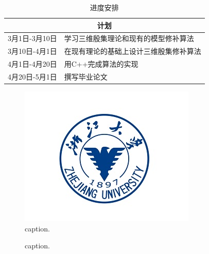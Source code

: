\documentclass[oneside,a4paper]{article}
\begin{document}
\begin{table}[!htbp]
    \centering
    \label{table1}
    \caption{进度安排}
    \begin{tabular}{|l|l|}
        \hline
        \multicolumn{2}{|c|}{计划} \\
        \hline
        3月1日-3月10日 & 学习三维殷集理论和现有的模型修补算法 \\
        \hline
        3月10日-4月1日 & 在现有理论的基础上设计三维殷集修补算法 \\
        \hline
        4月1日-4月20日 & 用C++完成算法的实现 \\
        \hline
        4月20日-5月1日 & 撰写毕业论文 \\
        \hline
    \end{tabular}
\end{table}

\begin{figure}[H]
    \centering
    \includegraphics[width=0.75\textwidth]{figure.png}
    \caption{caption.}
    \label{fig_1}
\end{figure}

\begin{figure}[!htbp]
    \centering
    \hfil
    \caption{caption.}
    \label{fig_sim_0}
\end{figure}
\end{document}
